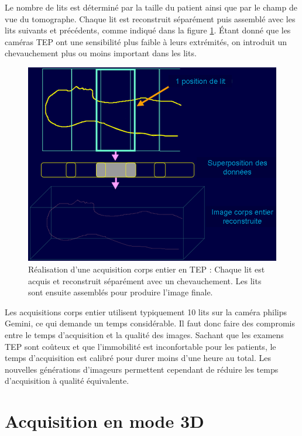 Le nombre de lits est déterminé par la taille du patient ainsi que par le champ de vue du tomographe. Chaque lit est reconstruit séparément puis assemblé avec les lits suivants et précédents, comme indiqué dans la figure \ref{fig:multilits}. \'Etant donné que les caméras TEP ont une sensibilité plus faible à leurs extrémités, on introduit un chevauchement plus ou moins important dans les lits.

\begin{figure}
\centering
\includegraphics[width=12cm]{images/multilits}
\caption[Acquisitions corps entier en TEP]{Réalisation d'une acquisition corps entier en TEP : Chaque lit est acquis et reconstruit séparément avec un chevauchement. Les lits sont ensuite assemblés pour produire l'image finale.}
\label{fig:multilits}
\end{figure}


Les acquisitions corps entier utilisent typiquement 10 lits sur la caméra philips Gemini, ce qui demande un temps considérable. Il faut donc faire des compromis entre le temps d'acquisition et la qualité des images. Sachant que les examens TEP sont coûteux et que l'immobilité est inconfortable pour les patients, le temps d'acquisition est calibré pour durer moins d'une heure au total. Les nouvelles générations d'imageurs permettent cependant de réduire les temps d'acquisition à qualité équivalente.


	\section{Acquisition en mode 3D}

